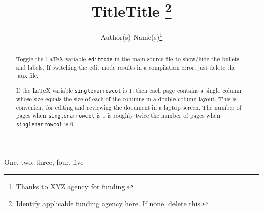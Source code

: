 \documentclass{article}
\begin{document}

\if{}
    \title{Title}
    \address{Author Affiliation(s)}
\else
    \title{Title
        \thanks{Identify applicable funding agency here. If none, delete this.}}


    \author{Author(s) Name(s)\thanks{Thanks to XYZ agency for funding.}}
\fi

\maketitle




\begin{abstract}
    Toggle the LaTeX variable \texttt{editmode} in the main source file to
    show/hide the bullets and labels. If switching the edit mode results
    in a compilation error, just delete the .aux file.

    If the LaTeX variable \texttt{singlenarrowcol} is 1, then each page contains
    a single column whose size equals the size of each of the columns in a
    double-column layout. This is convenient for editing and reviewing the
    document in a laptop screen. The number of pages when
    \texttt{singlenarrowcol} is 1 is roughly twice the number of pages when
    \texttt{singlenarrowcol} is 0.

\end{abstract}

\if{}
    \begin{IEEEkeywords}
        One, two, three, four, five
    \end{IEEEkeywords}
\fi
\end{document}
